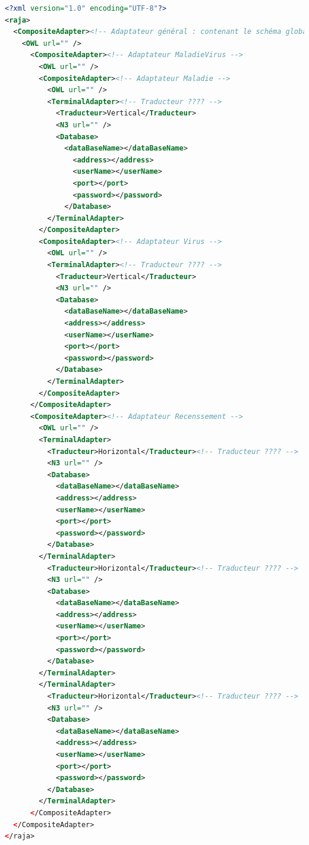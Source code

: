 \documentclass[12pt]{article}
\begin{document}
\begin{lstlisting}[language=XML]
<?xml version="1.0" encoding="UTF-8"?>
<raja>
  <CompositeAdapter><!-- Adaptateur général : contenant le schéma global -->
    <OWL url="" />
      <CompositeAdapter><!-- Adaptateur MaladieVirus -->
        <OWL url="" />
        <CompositeAdapter><!-- Adaptateur Maladie -->
          <OWL url="" />
          <TerminalAdapter><!-- Traducteur ???? -->
            <Traducteur>Vertical</Traducteur>
            <N3 url="" />
            <Database>
              <dataBaseName></dataBaseName>
                <address></address>
                <userName></userName>
                <port></port>
                <password></password>
              </Database>
          </TerminalAdapter>
        </CompositeAdapter>
        <CompositeAdapter><!-- Adaptateur Virus -->
          <OWL url="" />
          <TerminalAdapter><!-- Traducteur ???? -->
            <Traducteur>Vertical</Traducteur>
            <N3 url="" />
            <Database>
              <dataBaseName></dataBaseName>
              <address></address>
              <userName></userName>
              <port></port>
              <password></password>
            </Database>
          </TerminalAdapter>
        </CompositeAdapter>
      </CompositeAdapter>
      <CompositeAdapter><!-- Adaptateur Recenssement -->
        <OWL url="" />
        <TerminalAdapter>
          <Traducteur>Horizontal</Traducteur><!-- Traducteur ???? -->
          <N3 url="" />
          <Database>
            <dataBaseName></dataBaseName>
            <address></address>
            <userName></userName>
            <port></port>
            <password></password>
          </Database>
        </TerminalAdapter>
          <Traducteur>Horizontal</Traducteur><!-- Traducteur ???? -->
          <N3 url="" />
          <Database>
            <dataBaseName></dataBaseName>
            <address></address>
            <userName></userName>
            <port></port>
            <password></password>
          </Database>
        </TerminalAdapter>
        </TerminalAdapter>
          <Traducteur>Horizontal</Traducteur><!-- Traducteur ???? -->
          <N3 url="" />
          <Database>
            <dataBaseName></dataBaseName>
            <address></address>
            <userName></userName>
            <port></port>
            <password></password>
          </Database>
        </TerminalAdapter>
      </CompositeAdapter>
  </CompositeAdapter>
</raja>
\end{lstlisting}
\end{document}
